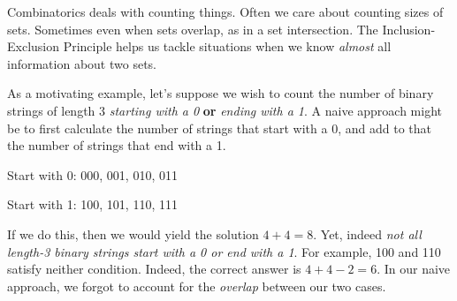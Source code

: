 \documentclass[main.tex]{subfiles}
\begin{document}
Combinatorics deals with counting things. Often we care about counting sizes of sets. Sometimes even when sets overlap, as in a set intersection.
The Inclusion-Exclusion Principle helps us tackle situations when we know \textit{almost} all information about two sets.

\begin{example}
	As a motivating example, let's suppose we wish to count the number of binary strings of length 3 \textit{starting with a 0} \textbf{or} \textit{ending with a 1}.
	A naive approach might be to first calculate the number of strings that start with a 0, and add to that the number of strings that end with a 1.
	
	\begin{multicols}{2}
		Start with 0: 000, 001, 010, 011
		
		\columnbreak
		
		Start with 1: 100, 101, 110, 111
	\end{multicols}
	
	If we do this, then we would yield the solution \(4+4 = 8\).
	Yet, indeed \textit{not all length-3 binary strings start with a 0 or end with a 1}.
	For example, 100 and 110 satisfy neither condition.
	Indeed, the correct answer is \(4+4-2=6\).
	In our naive approach, we forgot to account for the \textit{overlap} between our two cases.
\end{example}


\end{document}
